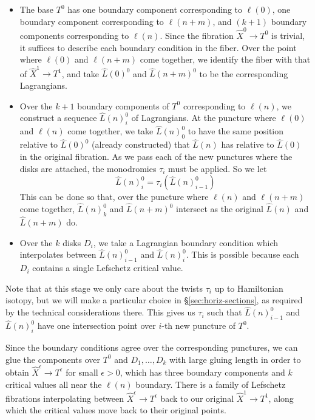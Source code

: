 \documentclass[12pt]{amsart}
\begin{document}
\begin{itemize}
\item The base $T^0$ has one boundary component corresponding to
  $\ell(0)$, one boundary component corresponding to $\ell(n+m)$, and
  $(k+1)$ boundary components corresponding to $\ell(n)$. Since the
  fibration $\hat{X}^0 \to T^0$ is trivial, it suffices to describe
  each boundary condition in the fiber. Over the point where $\ell(0)$
  and $\ell(n+m)$ come together, we identify the fiber with that of
  $\hat{X}^1 \to T^1$, and take $\hat{L}(0)^0$ and $\hat{L}(n+m)^0$ to
  be the corresponding Lagrangians.

\item Over the $k+1$ boundary components of $T^0$ corresponding to
  $\ell(n)$, we construct a sequence $\hat{L}(n)^0_i$ of
  Lagrangians. At the puncture where $\ell(0)$ and $\ell(n)$ come
  together, we take $\hat{L}(n)^0_0$ to have the same position
  relative to $\hat{L}(0)^0$ (already constructed) that $\hat{L}(n)$
  has relative to $\hat{L}(0)$ in the original fibration. As we pass
  each of the new punctures where the disks are attached, the
  monodromies $\tau_i$ must be applied. So we let 
  \begin{equation}
  \label{eq:Ln-twists}
    \hat{L}(n)^0_i = \tau_i(\hat{L}(n)^0_{i-1})
  \end{equation}
  This can be done so that, over the puncture where $\ell(n)$ and
  $\ell(n+m)$ come together, $\hat{L}(n)^0_k$ and $\hat{L}(n+m)^0$
  intersect as the original $\hat{L}(n)$ and $\hat{L}(n+m)$ do.

\item Over the $k$ disks $D_i$, we take a Lagrangian boundary
  condition which interpolates between $\hat{L}(n)^0_{i-1}$ and
  $\hat{L}(n)^0_i$. This is possible because each $D_i$ contains a
  single Lefschetz critical value.
\end{itemize}

Note that at this stage we only care about the twists $\tau_i$ up to
Hamiltonian isotopy, but we will make a particular choice in
\S\ref{sec:horiz-sections}, as required by the technical
considerations there. This gives us $\tau_i$ such that
$\hat{L}(n)^0_{i-1}$ and $\hat{L}(n)^0_i$ have one intersection point
over $i$-th new puncture of $T^0$.

Since the boundary conditions agree over the corresponding punctures,
we can glue the components over $T^0$ and $D_1,\dots,D_k$ with large
gluing length in order to obtain $\hat{X}^\epsilon \to T^\epsilon$ for
small $\epsilon > 0$, which has three boundary components and $k$
critical values all near the $\ell(n)$ boundary. There is a
family of Lefschetz fibrations interpolating between $\hat{X}^\epsilon
\to T^\epsilon$ back to our original $\hat{X}^1 \to T^1$, along which
the critical values move back to their original points. 
\end{document}
